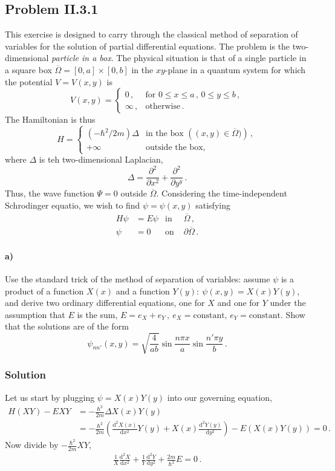 \documentclass[letterpaper,10pt]{article}
\def\d{\mathrm{d}}
\begin{document}
\subsection*{Problem II.3.1}
This exercise is designed to carry through the classical method of separation
of variables for the solution of partial differential equations. The problem is
the two-dimensional \emph{particle in a box}. The physical situation is that of
a single particle in a square box $\overline{\Omega}=[0,a]\times[0,b]$ in the
$xy$-plane in a quantum system for which the potential $V=V(x,y)$ is
\[
V(x,y)=
\begin{cases}
0\,,      & \text{for }0\leq x\leq a\,,\,0\leq y\leq b\,,\\
\infty\,, & \text{otherwise}\,.
\end{cases}
\]
The Hamiltonian is thus
\[
H=
\begin{cases}
(-\hbar^2/2m)\Delta
& \text{in the box }\left((x,y)\in\overline{\Omega})\right)\,,\\
+\infty
&\text{outside the box,}
\end{cases}
\]
where $\Delta$ is teh two-dimensional Laplacian,
\[
\Delta=\frac{\partial^2}{\partial x^2}+\frac{\partial^2}{\partial y^y}\,.
\]
Thus, the wave function $\Psi=0$ outside $\overline{\Omega}$. Considering the
time-independent Schrodinger equatio, we wish to find $\psi=\psi(x,y)$
satisfying
\begin{align*}
H\psi&=E\psi & \text{in }&\overline{\Omega}\,,\\
\psi&=0      & \text{on }&\partial\overline{\Omega}\,.
\end{align*}
\paragraph*{a)} Use the standard trick of the method of separation of variables:
assume $\psi$ is a product of a function $X(x)$ and a function
$Y(y):\:\psi(x,y)=X(x)Y(y)$, and derive two ordinary differential equations,
one for $X$ and one for $Y$ under the assumption that $E$ is the sum,
$E=e_X+e_Y\,,\:e_X=\text{constant, }e_Y=\text{constant}$. Show that the
solutions are of the form
\[
\psi_{nn'}(x,y)=\sqrt{\frac{4}{ab}}\sin\frac{n\pi x}{a}
\sin{\frac{n'\pi y}{b}}\,.
\]

\subsubsection*{Solution}
Let us start by plugging $\psi=X(x)Y(y)$ into our governing equation,
\begin{align*}
H(XY)-EXY&=-\frac{\hbar^2}{2m}\Delta X(x)Y(y)\\
&=-\frac{\hbar^2}{2m}\left(\frac{\d^2 X(x)}{\d x^2}Y(y)
+X(x)\frac{\d^2 Y(y)}{\d y^2}\right)-E(X(x)Y(y))=0\,.
\end{align*}
Now divide by $-\frac{\hbar^2}{2m}XY$,
\begin{align*}
\frac{1}{X}\frac{\d^2X}{\d x^2}+\frac{1}{Y}\frac{\d^2Y}{\d y^2}
+\frac{2m}{\hbar^2}E=0\,.
\end{align*}
\end{document}
